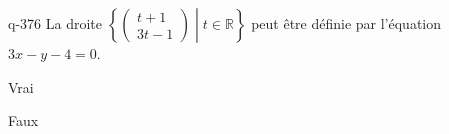 \begin{truefalse}{q-376}
La droite  $\left\{\begin{pmatrix}t+1\\3t-1\end{pmatrix}\middle| t\in\mathbb{R}\right\}$ peut être définie par l'équation $3x-y-4=0$.
\item* Vrai
\item Faux
\end{truefalse}

